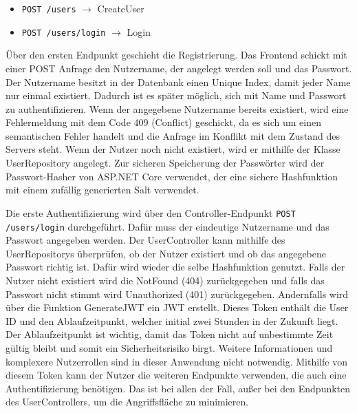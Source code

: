 \begin{itemize}
    \item \lstinline{POST /users} $\rightarrow$ CreateUser
    \item \lstinline{POST /users/login} $\rightarrow$ Login
\end{itemize}

Über den ersten Endpunkt geschieht die Registrierung. Das Frontend schickt mit einer POST Anfrage den Nutzername, der angelegt werden soll und das Passwort. Der Nutzername besitzt in der Datenbank einen Unique Index, damit jeder Name nur einmal existiert. Dadurch ist es später möglich, sich mit Name und Passwort zu authentifizieren.
Wenn der angegebene Nutzername bereits existiert, wird eine Fehlermeldung mit dem Code 409 (Conflict) geschickt, da es sich um einen semantischen Fehler handelt und die Anfrage im Konflikt mit dem Zustand des Servers steht. %
Wenn der Nutzer noch nicht existiert, wird er mithilfe der Klasse UserRepository angelegt.
Zur sicheren Speicherung der Passwörter wird der Passwort-Hasher von ASP.NET Core verwendet, der eine sichere Hashfunktion mit einem zufällig generierten Salt verwendet.

Die erste Authentifizierung wird über den Controller-Endpunkt \lstinline{POST /users/login} durchgeführt. Dafür muss der eindeutige Nutzername und das Passwort angegeben werden. Der UserController kann mithilfe des UserRepositorys überprüfen, ob der Nutzer existiert und ob das angegebene Passwort richtig ist. Dafür wird wieder die selbe Hashfunktion genutzt.
Falls der Nutzer nicht existiert wird die NotFound (404) zurückgegeben und falls das Passwort nicht stimmt wird Unauthorized (401) zurückgegeben.
Andernfalls wird über die Funktion GenerateJWT ein \ac{JWT} erstellt. Dieses Token enthält die User ID und den Ablaufzeitpunkt, welcher initial zwei Stunden in der Zukunft liegt. Der Ablaufzeitpunkt ist wichtig, damit das Token nicht auf unbestimmte Zeit gültig bleibt und somit ein Sicherheitsrisiko birgt. Weitere Informationen und komplexere Nutzerrollen sind in dieser Anwendung nicht notwendig. Mithilfe von diesem Token kann der Nutzer die weiteren Endpunkte verwenden, die auch eine Authentifizierung benötigen. Das ist bei allen der Fall, außer bei den Endpunkten des UserControllers, um die Angriffsfläche zu minimieren.

